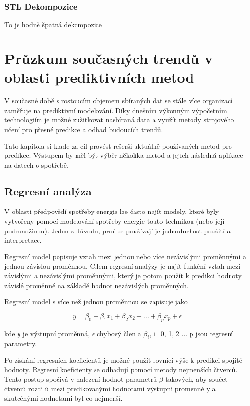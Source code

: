 \documentclass[FM,BP,fonts]{tulthesis}
\begin{document}
\subsection{STL Dekompozice}
To je hodně špatná dekompozice
 


\chapter{Průzkum současných trendů v oblasti prediktivních metod}
V současné době s rostoucím objemem sbíraných dat se stále více organizací zaměřuje na prediktivní modelování. Díky dnešním výkonným výpočetním technologiím je možné zužitkovat nasbíraná data a využít metody strojového učení pro přesné predikce a odhad budoucích trendů.

Tato kapitola si klade za cíl provést rešerši aktuálně používaných metod pro predikce. Výstupem by měl být výběr několika metod a jejich následná aplikace na datech o spotřebě.

\section{Regresní analýza}
V oblasti předpovědí spotřeby energie lze často najít modely, které byly vytvořeny pomocí modelování spotřeby energie touto technikou (nebo její podmnožinou). Jeden z důvodu, proč se používají je jednoduchost použití a interpretace.

Regresní model popisuje vztah mezi jednou nebo více nezávislými proměnnými a jednou závislou proměnnou. Cílem regresní analýzy je najít funkční vztah mezi závislými a nezávislými proměnnými, který je potom použít k predikci hodnoty závislé proměnné na základě hodnot nezávislých proměnných.

Regresní model s více než jednou proměnnou se zapisuje jako

\begin{equation}
	y = \beta_0 + \beta_1x_1 + \beta_2x_2 + ... + \beta_px_p +  \epsilon
\end{equation}

kde $y$ je výstupní proměnná, $\epsilon$ chybový člen a $\beta_i$, i=0, 1, 2 ... p jsou regresní parametry.

Po získání regresních koeficientů je možné použít rovnici výše k predikci spojité hodnoty. Regresní koeficienty se odhadují pomocí metody nejmenších čtverců. Tento postup spočívá v nalezení hodnot parametrů $\beta$ takových, aby součet čtverců rozdílů mezi predikovanými hodnotami výstupní proměnné y a skutečnými hodnotami byl co nejmenší.  \cite{hanousek1992moderni}
\end{document}

